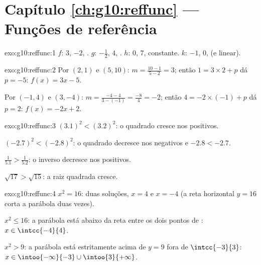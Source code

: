 \section*{Capítulo \ref{ch:g10:reffunc} --- Funções de referência}

\begin{solution}{exo:g10:reffunc:1}
$f$:  $3$,  $-2$, . \quad
$g$:  $-\frac12$,  $4$,
. \quad
$h$:  $0$,  $7$, constante. \quad
$k$:  $-1$,  $0$,  (e
linear).
\end{solution}

\begin{solution}{exo:g10:reffunc:2}
Por $(2,1)$ e $(5,10)$:  $m = \frac{10 - 1}{5 - 2} =
3$; então $1 = 3 \times 2 + p$ dá $p = -5$: $f(x) = 3x - 5$.

Por $(-1,4)$ e $(3,-4)$: 
$m = \frac{-4 - 4}{3 - (-1)} = \frac{-8}{4} = -2$; então
$4 = -2 \times (-1) + p$ dá $p = 2$: $f(x) = -2x + 2$.
\end{solution}

\begin{solution}{exo:g10:reffunc:3}
$(3.1)^2 < (3.2)^2$: o quadrado cresce nos positivos.

$(-2.7)^2 < (-2.8)^2$: o quadrado decresce nos negativos e
$-2.8 < -2.7$.

$\frac{1}{5.1} > \frac{1}{5.2}$: o inverso decresce nos positivos.

$\sqrt{17} > \sqrt{15}$: a raiz quadrada cresce.
\end{solution}

\begin{solution}{exo:g10:reffunc:4}
$x^2 = 16$: duas soluções, $x = 4$ e $x = -4$ (a reta horizontal
$y = 16$ corta a parábola duas vezes).

$x^2 \leq 16$: a parábola está abaixo da reta entre os dois pontos de
: $x \in \intcc{-4}{4}$.

$x^2 > 9$: a parábola está estritamente acima de $y = 9$ fora de
$\intcc{-3}{3}$: $x \in \intoo{-\infty}{-3} \cup \intoo{3}{+\infty}$.
\end{solution}

